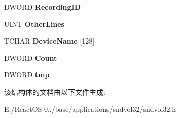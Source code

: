 \begin{DoxyCompactItemize}
D\+W\+O\+RD {\bfseries Recording\+ID}
\item 
\mbox{\label{struct___p_r_e_f_e_r_e_n_c_e_s___c_o_n_t_e_x_t_a46f406b722a5681313165643b91dba01}} 
U\+I\+NT {\bfseries Other\+Lines}
\item 
\mbox{\label{struct___p_r_e_f_e_r_e_n_c_e_s___c_o_n_t_e_x_t_a2c3944a4238356430ef9ed7b6f647ce5}} 
T\+C\+H\+AR {\bfseries Device\+Name} \mbox{[}128\mbox{]}
\item 
\mbox{\label{struct___p_r_e_f_e_r_e_n_c_e_s___c_o_n_t_e_x_t_a1054bf83def2ee40fd07f230232c25bd}} 
D\+W\+O\+RD {\bfseries Count}
\item 
\mbox{\label{struct___p_r_e_f_e_r_e_n_c_e_s___c_o_n_t_e_x_t_a4cde154a3f50a3833cb8f3d04d3bef64}} 
D\+W\+O\+RD {\bfseries tmp}
\end{DoxyCompactItemize}


该结构体的文档由以下文件生成\+:\begin{DoxyCompactItemize}
\item 
E\+:/\+React\+O\+S-\/0../base/applications/sndvol32/sndvol32.\+h\end{DoxyCompactItemize}
